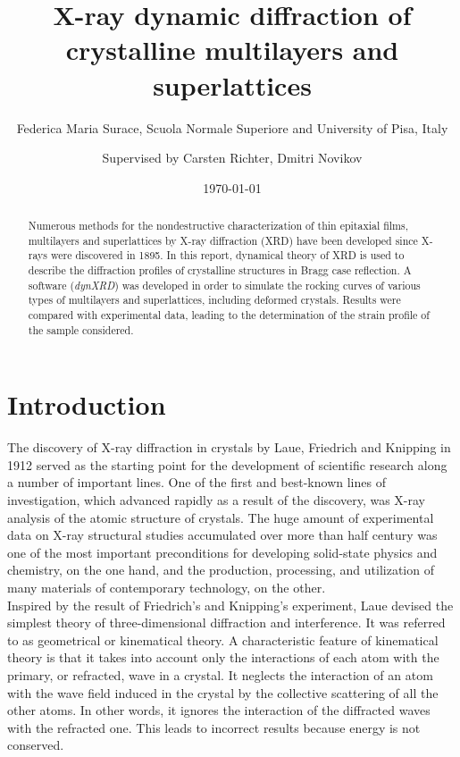 \documentclass[12pt,oneside,notitlepage,abstracton,a4paper]{scrartcl}
\title{\Large X-ray dynamic diffraction of crystalline multilayers and superlattices}
\author{\normalsize Federica Maria Surace, Scuola Normale Superiore and University of Pisa, Italy \and \normalsize Supervised by Carsten Richter, Dmitri Novikov}
\date{\normalsize \today}
\begin{document}
\maketitle

\begin{abstract}

\noindent

Numerous methods for the nondestructive characterization of thin epitaxial films,
multilayers and superlattices by X-ray diffraction (XRD) have been developed since X-rays were discovered in 1895. In this report, dynamical theory of XRD is used to describe the diffraction profiles of crystalline structures in Bragg case reflection. A software (\textit{dynXRD}) was developed in order to simulate the rocking curves of various types of multilayers and superlattices, including deformed crystals. Results were compared with experimental data, leading to the determination of the strain profile of the sample considered.
\end{abstract}



\newpage


\tableofcontents
\newpage 

\section{Introduction}
\label{intro}
The discovery of X-ray diffraction in crystals by Laue, Friedrich and Knipping in 1912 served as the starting point for the development of scientific research along a number of important lines. One of the first and best-known lines of investigation, which advanced rapidly as a result of the discovery, was X-ray analysis of the atomic structure of crystals. The huge amount of experimental data on X-ray structural studies accumulated over more than half century was one of the most important preconditions for developing solid-state physics and chemistry, on the one hand, and the production, processing, and utilization of many materials of contemporary technology, on the other.
\\

Inspired by the result of Friedrich's and Knipping's experiment, Laue devised the simplest theory of three-dimensional diffraction and interference. It was referred to as geometrical or kinematical theory. A characteristic feature of kinematical theory is that it takes into account only the interactions of each atom with the primary, or refracted, wave in a crystal. It neglects the interaction of an atom with the wave field induced in the crystal by the collective scattering of all the other atoms. In other words, it ignores the interaction of the diffracted waves with the refracted one. This leads to incorrect results because energy is not conserved.
\end{document}
